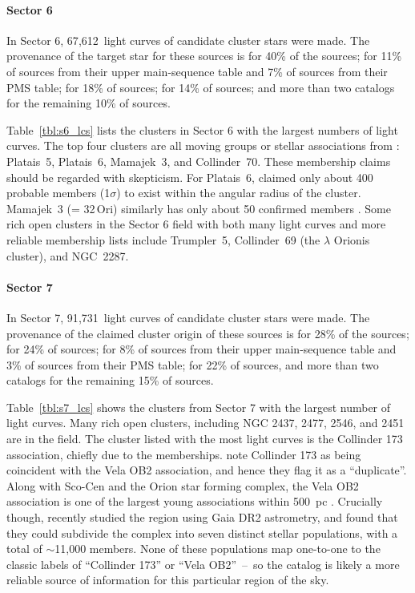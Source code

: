 \documentclass[12pt,twocolumn,tighten]{aastex62}
\newcommand{\sVInumberlcs}{67{,}612\ }  %
\newcommand{\sVIInumberlcs}{91{,}731\ }  %
\begin{document}
\paragraph{Sector 6}
In Sector 6, \sVInumberlcs light curves of candidate cluster stars
were made. The provenance of the target star for these sources is
\citet{dias_proper_2014} for 40\% of the sources; \citet{zari_3d_2018}
for 11\% of sources from their upper main-sequence table and 7\% of
sources from their PMS table; \citet{Kharchenko_et_al_2013} for 18\%
of sources; \citet{cantat-gaudin_gaia_2018} for 14\% of sources; and
more than two catalogs for the remaining 10\% of sources.

Table~\ref{tbl:s6_lcs} lists the clusters in Sector 6 with the largest
numbers of light curves. The top four clusters are all moving groups
or stellar associations from \citet{dias_proper_2014}: Platais~5,
Platais~6, Mamajek~3, and Collinder~70.  These membership claims
should be regarded with skepticism.  For Platais~6,
\citet{Kharchenko_et_al_2013} claimed only about 400 probable members
(1$\sigma$) to exist within the angular radius of the cluster.
Mamajek~3 (= 32$\,$Ori) similarly has only about 50 confirmed members
\citep{bell_32ori_2017}.  Some rich open clusters in the Sector 6
field with both many light curves and more reliable membership lists
include Trumpler~5, Collinder~69 (the $\lambda$ Orionis cluster), and
NGC~2287.


\paragraph{Sector 7}
In Sector 7, \sVIInumberlcs light curves of candidate cluster stars
were made.  The provenance of the claimed cluster origin of these
sources is \citet{dias_proper_2014} for 28\% of the sources;
\citet{Kharchenko_et_al_2013} for 24\% of sources;
\citet{zari_3d_2018} for 8\% of sources from their upper main-sequence
table and 3\% of sources from their PMS table;
\citet{cantat-gaudin_gaia_2018} for 22\% of sources, and more than two
catalogs for the remaining 15\% of sources.

Table~\ref{tbl:s7_lcs} shows the clusters from Sector 7 with the
largest number of light curves.  Many rich open clusters, including
NGC 2437, 2477, 2546, and 2451 are in the field.  The cluster listed
with the most light curves is the Collinder 173 association, chiefly
due to the \citet{dias_proper_2014} memberships.
\citet{Kharchenko_et_al_2013} note Collinder 173 as being coincident
with the Vela OB2 association, and hence they flag it as a
``duplicate''.  Along with Sco-Cen and the Orion star forming complex,
the Vela OB2 association is one of the largest young associations
within 500~pc \citep{zari_3d_2018}.  Crucially though,
\citet{cantat-gaudin_velaOB2_2019} recently studied the region using
Gaia DR2 astrometry, and found that they could subdivide the complex
into seven distinct stellar populations, with a total of $\sim$11,000
members.  None of these populations map one-to-one to the classic
labels of ``Collinder 173'' or ``Vela OB2''~--~so the
\citet{cantat-gaudin_velaOB2_2019} catalog is likely a more reliable
source of information for this particular region of the sky.
\end{document}
